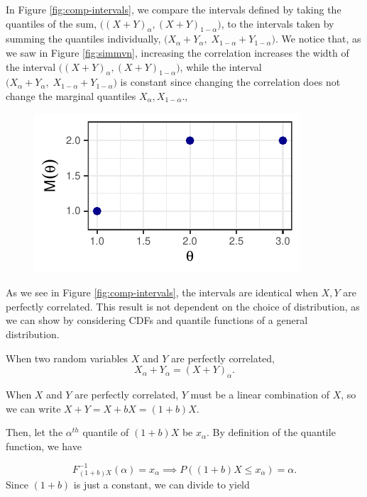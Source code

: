 \documentclass[12pt,twoside]{smiththesis}
\begin{document}
In Figure \ref{fig:comp-intervals}, we compare the intervals defined by taking the quantiles of the sum, \(\Big((X+Y)_\alpha, (X+Y)_{1-\alpha}\Big)\), to the intervals taken by summing the quantiles individually, \(\Big(X_\alpha +Y_\alpha, \; X_{1-\alpha} +Y_{1-\alpha}\Big)\). We notice that, as we saw in Figure \ref{fig:simmvn}, increasing the correlation increases the width of the interval \(\Big((X+Y)_\alpha, (X+Y)_{1-\alpha}\Big)\), while the interval \(\Big(X_\alpha +Y_\alpha, \; X_{1-\alpha} +Y_{1-\alpha}\Big)\) is constant since changing the correlation does not change the marginal quantiles \(X_\alpha, X_{1-\alpha}\).,
\begin{figure}

{\centering \includegraphics{thesis_files/figure-latex/unnamed-chunk-4-1} 

}

\caption{\label{fig:comp-intervals}}\label{fig:unnamed-chunk-4}
\end{figure}
As we see in Figure \ref{fig:comp-intervals}, the intervals are identical when \(X,Y\) are perfectly correlated. This result is not dependent on the choice of distribution, as we can show by considering CDFs and quantile functions of a general distribution.
\begin{tcolorbox}[title = Quantiles of the Sum of Perfectly Correlated Random Variables]
When two random variables $X$ and $Y$ are perfectly correlated,
$$X_\alpha + Y_\alpha = (X+Y)_\alpha.$$
\end{tcolorbox}
When \(X\) and \(Y\) are perfectly correlated, \(Y\) must be a linear combination of \(X\), so we can write \(X+Y= X+bX=(1+b)X\).

Then, let the \(\alpha^{th}\) quantile of \((1+b)X\) be \(x_\alpha\). By definition of the quantile function, we have

\[F^{-1}_{(1+b) X } (\alpha) = x_\alpha \implies P((1+b) X \leq x_\alpha) = \alpha.\]
Since \((1+b)\) is just a constant, we can divide to yield
\end{document}
